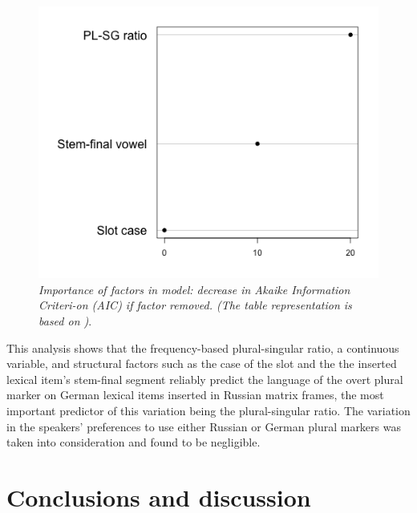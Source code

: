 \begin{figure}
\centering
	    	\includegraphics[scale=0.5]{figures/6-Figure_5.png}
\vspace{2mm}
\caption{\textit{Importance of factors in model: decrease in Akaike Information Criteri-on (AIC) if factor removed. (The table representation is based on \cite{szmrecsanyi-2013})}.}\label{fig:6:5}
\end{figure}

This analysis shows that the frequency-based plural-singular ratio, a continuous variable, and structural factors such as the case of the slot and the the inserted lexical item’s stem-final segment  reliably predict the language of the overt plural marker on German lexical items inserted in Russian matrix frames, the most important predictor of this variation being the plural-singular ratio. The variation in the speakers' preferences to use either Russian or German plural markers was taken into consideration and found to be negligible.

\section{Conclusions and discussion}


